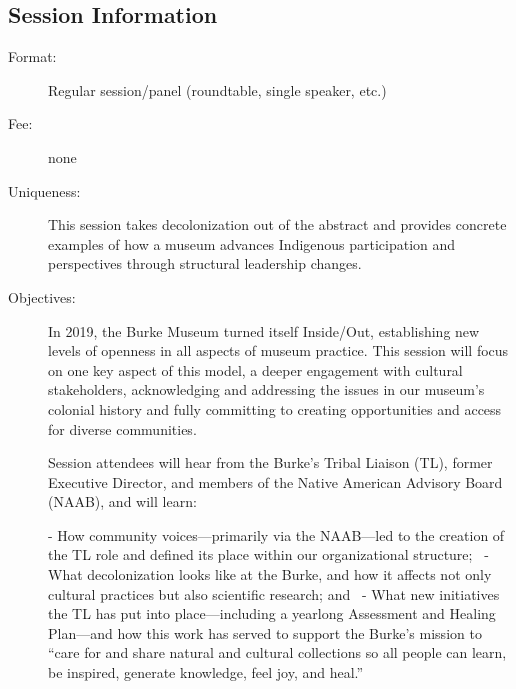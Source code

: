 \documentclass{report}
\begin{document}
              \subsection*{Session Information}
                \begin{description}
                  \item [Format:] Regular session/panel (roundtable, single speaker, etc.)
							    
								  \item [Fee:]none
							     
							    \item [Uniqueness:]This session takes decolonization out of the abstract and provides concrete examples of how a museum advances Indigenous participation and perspectives through structural leadership changes.
							    \item [Objectives:]In 2019, the Burke Museum turned itself Inside/Out, establishing new levels of openness in all aspects of museum practice. This session will focus on one key aspect of this model, a deeper engagement with cultural stakeholders, acknowledging and addressing the issues in our museum’s colonial history and fully committing to creating opportunities and access for diverse communities.

Session attendees will hear from the Burke’s Tribal Liaison (TL), former Executive Director, and members of the Native American Advisory Board (NAAB), and will learn:

- How community voices—primarily via the NAAB—led to the creation of the TL role and defined its place within our organizational structure; 
- What decolonization looks like at the Burke, and how it affects not only cultural practices but also scientific research; and 
- What new initiatives the TL has put into place—including a yearlong Assessment and Healing Plan—and how this work has served to support the Burke’s mission to “care for and share natural and cultural collections so all people can learn, be inspired, generate knowledge, feel joy, and heal.”


\end{description}
\end{document}
